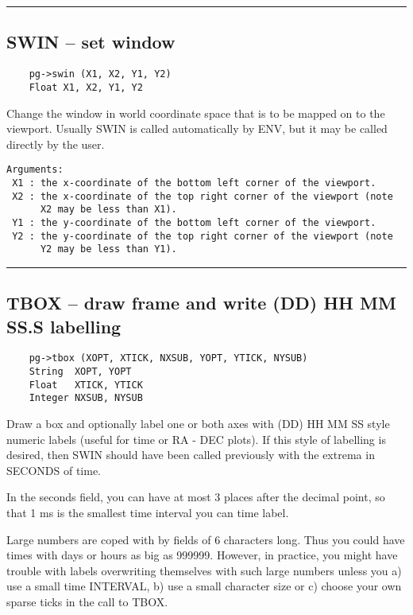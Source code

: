 \hrule

\subsection*{SWIN -- set window }

\begin{verbatim}
    pg->swin (X1, X2, Y1, Y2)
    Float X1, X2, Y1, Y2
\end{verbatim}

Change the window in world coordinate space that is to be mapped on to
the viewport.  Usually SWIN is called automatically by ENV, but it may
be called directly by the user.

\begin{verbatim}
Arguments:
 X1 : the x-coordinate of the bottom left corner of the viewport. 
 X2 : the x-coordinate of the top right corner of the viewport (note
      X2 may be less than X1). 
 Y1 : the y-coordinate of the bottom left corner of the viewport. 
 Y2 : the y-coordinate of the top right corner of the viewport (note
      Y2 may be less than Y1). 
\end{verbatim}

\hrule

\subsection*{TBOX -- draw frame and write (DD) HH MM SS.S labelling }

\begin{verbatim}
    pg->tbox (XOPT, XTICK, NXSUB, YOPT, YTICK, NYSUB)
    String  XOPT, YOPT
    Float   XTICK, YTICK
    Integer NXSUB, NYSUB
\end{verbatim}

Draw a box and optionally label one or both axes with (DD) HH MM SS
style numeric labels (useful for time or RA - DEC plots).  If this
style of labelling is desired, then SWIN should have been called
previously with the extrema in SECONDS of time.

In the seconds field, you can have at most 3 places after the decimal
point, so that 1 ms is the smallest time interval you can time label.

Large numbers are coped with by fields of 6 characters long.  Thus you
could have times with days or hours as big as 999999.  However, in
practice, you might have trouble with labels overwriting themselves
with such large numbers unless you a) use a small time INTERVAL, b)
use a small character size or c) choose your own sparse ticks in the
call to TBOX.

